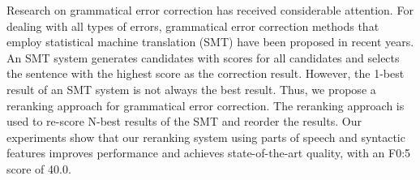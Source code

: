 Research on grammatical error correction has received considerable attention. For dealing with all types of errors, grammatical error correction methods that employ statistical machine translation (SMT) have been proposed in recent years. An SMT system generates candidates with scores for all candidates and selects the sentence with the highest score as the correction result. However, the 1-best result of an SMT system is not always the best result. Thus, we propose a reranking approach for grammatical error correction. The reranking approach is used to re-score N-best results of the SMT and reorder the results. Our experiments show that our reranking system using parts of speech and syntactic features improves performance and achieves state-of-the-art quality, with an F0:5 score of 40.0.
